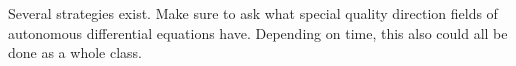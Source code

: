\documentclass[]{ximera}
\begin{document}
\begin{instructorNotes}
Several strategies exist.  
Make sure to ask what special quality direction fields of autonomous differential equations have.  
Depending on time, this also could all be done as a whole class.
\end{instructorNotes}
















	
	
	
	
	
	
	
	
	

	










								
				
				
	
\end{document}
